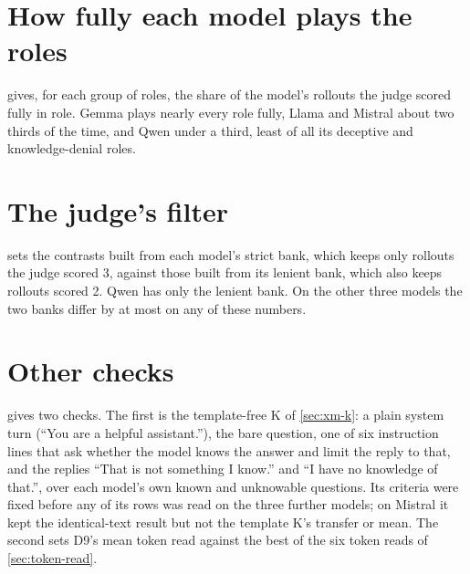 \section*{How fully each model plays the roles}

 gives, for each group of roles, the share of the model's rollouts the judge scored
fully in role. Gemma plays nearly every role fully, Llama and Mistral about two thirds of the time, and
Qwen under a third, least of all its deceptive and knowledge-denial roles.

\begin{table}[htbp]
\centering
\footnotesize
\caption{Share of each persona group's rollouts the judge scored 3, fully in role.}
\label{tab:xm-roleplay}
\fittable{}
\end{table}

\section*{The judge's filter}

 sets the contrasts built from each model's strict bank, which keeps only rollouts the
judge scored 3, against those built from its lenient bank, which also keeps rollouts scored 2. Qwen has
only the lenient bank. On the other three models the two banks differ by at most 
on any of these numbers.

\begin{table}[htbp]
\centering
\footnotesize
\caption{The contrasts from the strict and the lenient persona bank at each model's mid block.}
\label{tab:xm-banks}
\fittable{}
\end{table}

\section*{Other checks}

 gives two checks. The first is the template-free K of \cref{sec:xm-k}: a plain system
turn (``You are a helpful assistant.''), the bare question, one of six instruction lines that ask whether
the model knows the answer and limit the reply to that, and the replies ``That is not something I know.''
and ``I have no knowledge of that.'', over each model's own known and unknowable questions. Its criteria
were fixed before any of its rows was read on the three further models; on Mistral it kept the
identical-text result but not the template K's transfer or mean. The second sets D9's mean token read
against the best of the six token reads of \cref{sec:token-read}.

\begin{table}[htbp]
\centering
\footnotesize
\caption{The template-free K beside the template K, and D9's token reads, at each model's mid block.}
\label{tab:xm-checks}
\fittable{}
\end{table}

\FloatBarrier
